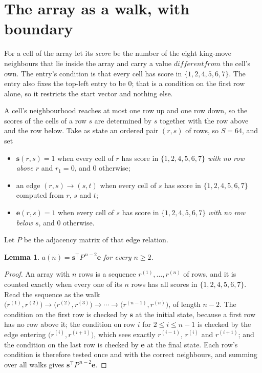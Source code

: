 \documentclass[11pt,a4paper]{article}
\theoremstyle{plain}
\newtheorem{lemma}[theorem]{Lemma}
\theoremstyle{definition}
\begin{document}
\section{The array as a walk, with boundary}

For a cell of the array let its \emph{score} be the number of the eight king-move neighbours that lie inside
the array and carry a value $different from$ the cell's own. The entry's condition is that every cell
has score in $\{1,2,4,5,6,7\}$. The entry also fixes the top-left entry to be $0$; that is a condition on the first row alone, so it restricts the start vector and nothing else.

A cell's neighbourhood reaches at most one row up and one row down, so the scores of the
cells of a row $s$ are determined by $s$ together with the row above and the row below.
Take as state an ordered pair $(r,s)$ of rows, so $S=64$, and set
\begin{itemize}
\item $\mathbf{s}(r,s)=1$ when every cell of $r$ has score in $\{1,2,4,5,6,7\}$ \emph{with no row
above $r$} and $r_1=0$, and $0$ otherwise;
\item an edge $(r,s)\to(s,t)$ when every cell of $s$ has score in $\{1,2,4,5,6,7\}$ computed from
$r$, $s$ and $t$;
\item $\mathbf{e}(r,s)=1$ when every cell of $s$ has score in $\{1,2,4,5,6,7\}$ \emph{with no row
below $s$}, and $0$ otherwise.
\end{itemize}
Let $P$ be the adjacency matrix of that edge relation.

\begin{lemma}\label{lem:walk}
$a(n)=\mathbf{s}^{\!\top}P^{\,n-2}\mathbf{e}$ for every $n\ge2$.
\end{lemma}

\begin{proof}
An array with $n$ rows is a sequence $r^{(1)},\dots,r^{(n)}$ of rows, and it is counted
exactly when every one of its $n$ rows has all scores in $\{1,2,4,5,6,7\}$. Read the sequence as the
walk $\bigl(r^{(1)},r^{(2)}\bigr)\to\bigl(r^{(2)},r^{(3)}\bigr)\to\cdots\to
\bigl(r^{(n-1)},r^{(n)}\bigr)$, of length $n-2$. The condition on the first row is
checked by $\mathbf{s}$ at the initial state, because a first row has no row above it; the
condition on row $i$ for $2\le i\le n-1$ is checked by the edge entering
$\bigl(r^{(i)},r^{(i+1)}\bigr)$, which sees exactly $r^{(i-1)}$, $r^{(i)}$ and
$r^{(i+1)}$; and the condition on the last row is checked by $\mathbf{e}$ at the final
state. Each row's condition is therefore tested once and with the correct neighbours, and
summing over all walks gives $\mathbf{s}^{\!\top}P^{\,n-2}\mathbf{e}$.
\end{proof}
\end{document}
